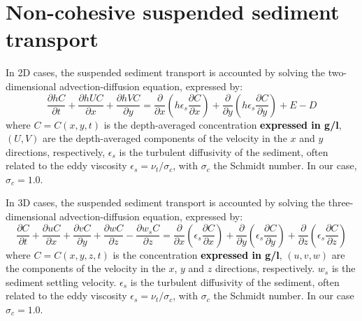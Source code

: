 \section{Non-cohesive suspended sediment transport}
\label{sec:NCO:susp}
In 2D cases, the suspended sediment transport is accounted by solving the two-dimensional advection-diffusion equation, expressed by:
\begin{equation}\label{eq:2DADE}
\frac{\partial hC}{\partial t} + \frac{\partial hUC}{\partial x} + \frac{\partial hVC}{\partial y} =
\frac{\partial}{\partial x}\left(h\epsilon_s\frac{\partial C}{\partial x}\right) +
\frac{\partial}{\partial y}\left(h\epsilon_s\frac{\partial C}{\partial y}\right) + E-D
\end{equation}
where $C=C(x,y,t)$ is the depth-averaged concentration \textcolor{black}{\bf expressed in g/l}, $(U,V)$ are the depth-averaged components of the velocity in the $x$ and $y$ directions, respectively, $\epsilon_s$ is the turbulent diffusivity of the sediment, often related to the eddy viscosity $\epsilon_s=\nu_t/\sigma_c$, with $\sigma_c$ the Schmidt number. In our case, $\sigma_c=1.0$.

In 3D cases, the suspended sediment transport is accounted by solving the three-dimensional advection-diffusion equation, expressed by:
\begin{equation}\label{eq:3DADE}
\frac{\partial C}{\partial t} + \frac{\partial uC}{\partial x} + \frac{\partial vC}{\partial y} + \frac{\partial wC}{\partial z} -\frac{\partial w_sC}{\partial z} =
\frac{\partial}{\partial x}\left(\epsilon_s\frac{\partial C}{\partial x}\right) +
\frac{\partial}{\partial y}\left(\epsilon_s\frac{\partial C}{\partial y}\right) +
\frac{\partial}{\partial z}\left(\epsilon_s\frac{\partial C}{\partial z}\right)
\end{equation}
where $C=C(x,y,z,t)$ is the concentration \textcolor{black}{\bf expressed in g/l}, $(u,v,w)$ are the components of the velocity in the $x$, $y$ and $z$ directions, respectively. $w_s$ is the sediment settling velocity. $\epsilon_s$ is the turbulent diffusivity of the sediment, often related to the eddy viscosity $\epsilon_s=\nu_t/\sigma_c$, with $\sigma_c$ the Schmidt number. In our case $\sigma_c=1.0$.

